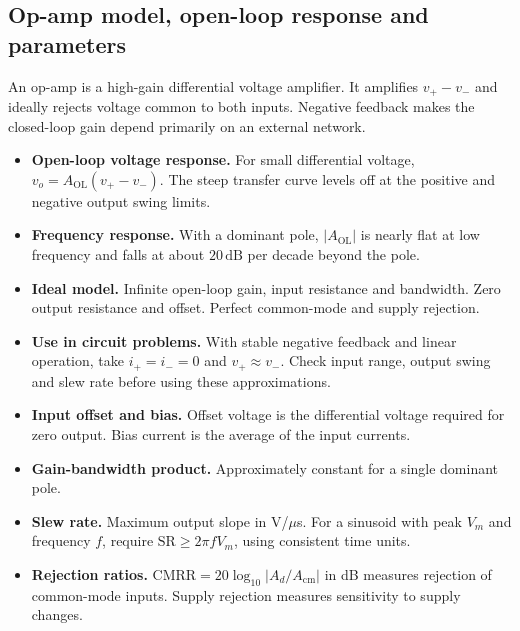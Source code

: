 \documentclass[12pt,a4paper]{article}
\begin{document}
\subsection{Op-amp model, open-loop response and parameters}
\begin{tcolorbox}[defbox,title={Operational amplifier}]
An op-amp is a high-gain differential voltage amplifier. It amplifies \(v_+-v_-\) and ideally rejects voltage common to both inputs. Negative feedback makes the closed-loop gain depend primarily on an external network.
\end{tcolorbox}

\begin{itemize}[leftmargin=*, itemsep=3pt, topsep=4pt]
  \item \textbf{Open-loop voltage response.} For small differential voltage, \(v_o=A_{\mathrm{OL}}(v_+-v_-)\). The steep transfer curve levels off at the positive and negative output swing limits.
  \item \textbf{Frequency response.} With a dominant pole, \(\lvert A_{\mathrm{OL}}\rvert\) is nearly flat at low frequency and falls at about \(20\,\mathrm{dB}\) per decade beyond the pole.
  \item \textbf{Ideal model.} Infinite open-loop gain, input resistance and bandwidth. Zero output resistance and offset. Perfect common-mode and supply rejection.
  \item \textbf{Use in circuit problems.} With stable negative feedback and linear operation, take \(i_+=i_-=0\) and \(v_+\approx v_-\). Check input range, output swing and slew rate before using these approximations.
\end{itemize}

\begin{itemize}[leftmargin=*, itemsep=3pt, topsep=4pt]
  \item \textbf{Input offset and bias.} Offset voltage is the differential voltage required for zero output. Bias current is the average of the input currents.
  \item \textbf{Gain-bandwidth product.} Approximately constant for a single dominant pole.
  \item \textbf{Slew rate.} Maximum output slope in V/\(\mu\)s. For a sinusoid with peak \(V_m\) and frequency \(f\), require \(\mathrm{SR}\ge 2\pi f V_m\), using consistent time units.
  \item \textbf{Rejection ratios.} \(\mathrm{CMRR}=20\log_{10}\lvert A_d/A_{\mathrm{cm}}\rvert\) in dB measures rejection of common-mode inputs. Supply rejection measures sensitivity to supply changes.
\end{itemize}
\end{document}
